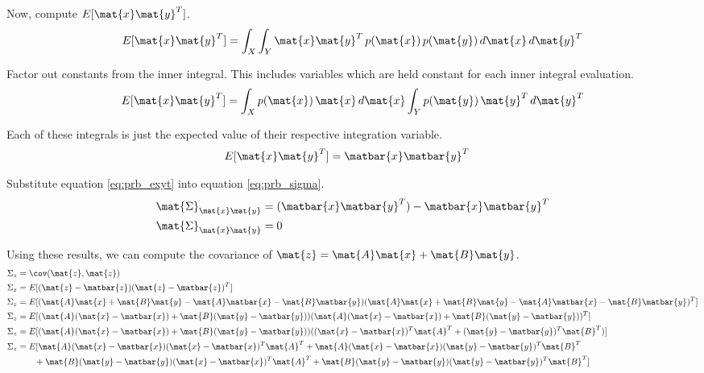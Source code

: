 Now, compute $E[\mat{x}\mat{y}^T]$.
\begin{equation*}
  E[\mat{x}\mat{y}^T] = \int_X \int_Y \mat{x}\mat{y}^T \,p(\mat{x})
    \,p(\mat{y}) \,d\mat{x} \,d\mat{y}^T
\end{equation*}

Factor out constants from the inner integral. This includes variables which are
held constant for each inner integral evaluation.
\begin{equation*}
  E[\mat{x}\mat{y}^T] = \int_X p(\mat{x}) \,\mat{x} \,d\mat{x}
    \int_Y p(\mat{y}) \,\mat{y}^T \,d\mat{y}^T
\end{equation*}

Each of these integrals is just the expected value of their respective
integration variable.
\begin{align}
  E[\mat{x}\mat{y}^T] &= \matbar{x}\matbar{y}^T \label{eq:prb_exyt}
\end{align}

Substitute equation \eqref{eq:prb_exyt} into equation \eqref{eq:prb_sigma}.
\begin{align*}
  \mat{\Sigma}_{\mat{x}\mat{y}} &= (\matbar{x}\matbar{y}^T) -
    \matbar{x}\matbar{y}^T \\
  \mat{\Sigma}_{\mat{x}\mat{y}} &= 0
\end{align*}

Using these results, we can compute the covariance of
$\mat{z} = \mat{A}\mat{x} + \mat{B}\mat{y}$.
\begin{align*}
  \Sigma_z &= \cov(\mat{z}, \mat{z}) \\
  \Sigma_z &= E[(\mat{z} - \matbar{z})(\mat{z} - \matbar{z})^T] \\
  \Sigma_z &= E[(\mat{A}\mat{x} + \mat{B}\mat{y} - \mat{A}\matbar{x} -
    \mat{B}\matbar{y})(\mat{A}\mat{x} + \mat{B}\mat{y} -
    \mat{A}\matbar{x} - \mat{B}\matbar{y})^T] \\
  \Sigma_z &= E[(\mat{A}(\mat{x} - \matbar{x}) +
    \mat{B}(\mat{y} - \matbar{y}))
    (\mat{A}(\mat{x} - \matbar{x}) +
     \mat{B}(\mat{y} - \matbar{y}))^T] \\
  \Sigma_z &= E[(\mat{A}(\mat{x} - \matbar{x}) +
    \mat{B}(\mat{y} - \matbar{y}))
    ((\mat{x} - \matbar{x})^T\mat{A}^T +
     (\mat{y} - \matbar{y})^T\mat{B}^T)] \\
  \Sigma_z &= E[
    \mat{A}(\mat{x} - \matbar{x})(\mat{x} - \matbar{x})^T\mat{A}^T +
    \mat{A}(\mat{x} - \matbar{x})(\mat{y} - \matbar{y})^T\mat{B}^T \\
    &\qquad + \mat{B}(\mat{y} - \matbar{y})(\mat{x} - \matbar{x})^T\mat{A}^T +
    \mat{B}(\mat{y} - \matbar{y})(\mat{y} - \matbar{y})^T\mat{B}^T]
\end{align*}

